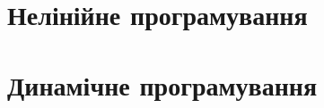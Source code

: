 \documentclass[a5paper,10pt]{book}
\begin{document}
\setcounter{tocdepth}{1}
\tableofcontents




\chapter{Нелінійне програмування}

\chapter{Динамічне програмування}
\end{document}
